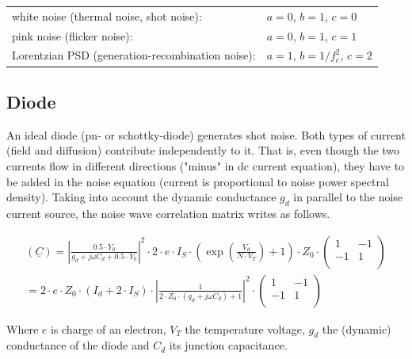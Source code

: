 \addvspace{12pt}

\begin{tabular}{ll}
white noise (thermal noise, shot noise):         & $a=0$, $b=1$, $c=0$ \\
pink noise (flicker noise):                      & $a=0$, $b=1$, $c=1$ \\
Lorentzian PSD (generation-recombination noise): & $a=1$, $b=1/f_c^2$, $c=2$ \\
\end{tabular}


\subsection{Diode}
\label{sec:nw_diode}

An ideal diode (pn- or schottky-diode) generates shot noise.  Both
types of current (field and diffusion) contribute independently to it.
That is, even though the two currents flow in different directions
("minus" in dc current equation), they have to be added in the noise
equation (current is proportional to noise power spectral density).
Taking into account the dynamic conductance $g_d$ in parallel to the
noise current source, the noise wave correlation matrix writes as
follows.

\begin{equation}
\begin{split}
(\underline{C})
 =  \left| \frac{0.5\cdot Y_0}{g_d+j\omega C_d + 0.5\cdot Y_0}\right|^2  \cdot 2\cdot e\cdot I_S\cdot
    \left( \exp\left( \frac{V_{d}}{N\cdot V_T} \right) +1 \right) \cdot Z_0\cdot\begin{pmatrix}
   1 & -1\\
  -1 &  1\\
\end{pmatrix} \\
 = 2\cdot e\cdot Z_0\cdot \left(I_{d} + 2\cdot I_{S}\right)\cdot
    \left| \frac{1}{2\cdot Z_0\cdot (g_d+j\omega C_d) + 1}\right|^2 \cdot
\begin{pmatrix}
   1 & -1\\
  -1 &  1\\
\end{pmatrix}
\end{split}
\end{equation}

Where $e$ is charge of an electron, $V_T$ the temperature voltage,
$g_d$ the (dynamic) conductance of the diode and $C_d$ its junction
capacitance.

